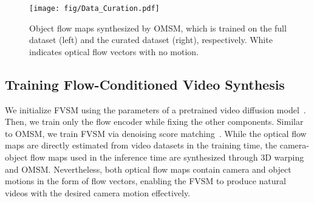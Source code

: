 \begin{figure}[t!]
\centering
\texttt{[image: fig/Data\_Curation.pdf]}
\vspace{-6.3mm}
\caption{
Object flow maps synthesized by OMSM, which is trained on the full dataset (left) and the curated dataset (right), respectively.
White indicates optical flow vectors with no motion.
}
\vspace{-5mm}
\label{fig:Data_Curation}
\end{figure}




\subsection{Training Flow-Conditioned Video Synthesis}
\label{sec:Training_VSM}
We initialize FVSM using the parameters of a pretrained video diffusion model~\cite{blattmann2023stable}.
Then, we train only the flow encoder while fixing the other components.
Similar to OMSM, we train FVSM via denoising score matching~\cite{karras2022elucidating}.
While the optical flow maps are directly estimated from video datasets in the training time, the camera-object flow maps used in the inference time are synthesized through 3D warping and OMSM. Nevertheless, both optical flow maps contain camera and object motions in the form of flow vectors, enabling the FVSM to produce natural videos with the desired camera motion effectively.

